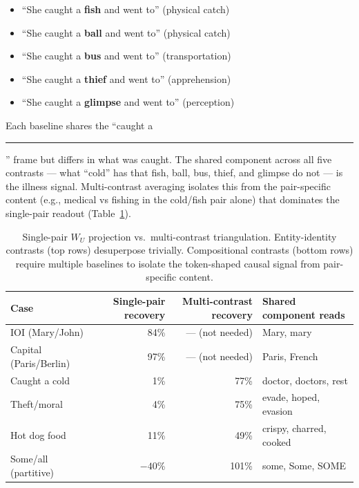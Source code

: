 \documentclass[11pt]{article}
\newcommand{\WU}{W_U}
\begin{document}
\begin{itemize}[leftmargin=*]
\item ``She caught a \textbf{fish} and went to'' (physical catch)
\item ``She caught a \textbf{ball} and went to'' (physical catch)
\item ``She caught a \textbf{bus} and went to'' (transportation)
\item ``She caught a \textbf{thief} and went to'' (apprehension)
\item ``She caught a \textbf{glimpse} and went to'' (perception)
\end{itemize}

Each baseline shares the ``caught a \rule{1em}{0.4pt}'' frame but differs in what was caught.
The shared component across all five contrasts --- what ``cold'' has that fish,
ball, bus, thief, and glimpse do not --- is the illness signal. Multi-contrast
averaging isolates this from the pair-specific content (e.g., medical vs
fishing in the cold/fish pair alone) that dominates the single-pair readout
(Table~\ref{tab:triangulation}).

\begin{table}[htbp]
\centering
\small
\begin{tabular}{lrrl}
\toprule
Case & Single-pair recovery & Multi-contrast recovery & Shared component reads \\
\midrule
IOI (Mary/John) & 84\% & --- (not needed) & Mary, mary \\
Capital (Paris/Berlin) & 97\% & --- (not needed) & Paris, French \\
Caught a cold & 1\% & 77\% & doctor, doctors, rest \\
Theft/moral & 4\% & 75\% & evade, hoped, evasion \\
Hot dog food & 11\% & 49\% & crispy, charred, cooked \\
Some/all (partitive) & $-40$\% & 101\% & some, Some, SOME \\
\bottomrule
\end{tabular}
\caption{Single-pair $\WU$ projection vs.\ multi-contrast triangulation.
Entity-identity contrasts (top rows) desuperpose trivially. Compositional
contrasts (bottom rows) require multiple baselines to isolate the
token-shaped causal signal from pair-specific content.}
\label{tab:triangulation}
\end{table}
\end{document}

